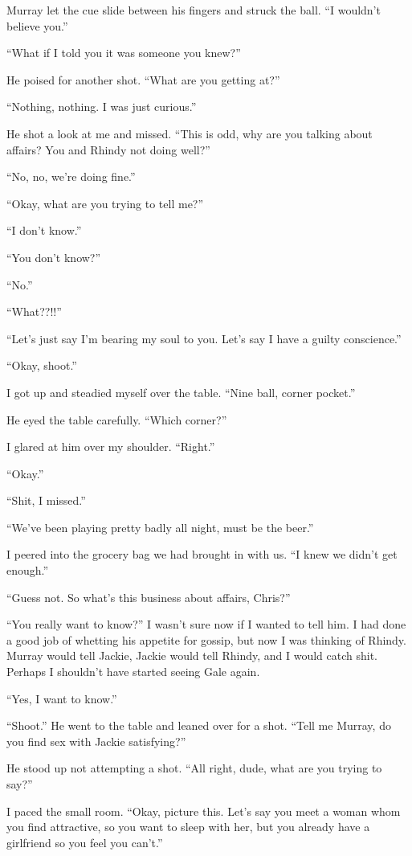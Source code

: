 Murray let the cue slide between his fingers and struck the ball. ``I
wouldn't believe you.''

``What if I told you it was someone you knew?''

He poised for another shot. ``What are you getting at?''

``Nothing, nothing. I was just curious.''

He shot a look at me and missed. ``This is odd, why are you talking
about affairs? You and Rhindy not doing well?''

``No, no, we're doing fine.''

``Okay, what are you trying to tell me?''

``I don't know.''

``You don't know?''

``No.''

``What??!!''

``Let's just say I'm bearing my soul to you. Let's say I have a guilty
conscience.''

``Okay, shoot.''

I got up and steadied myself over the table. ``Nine ball, corner
pocket.''

He eyed the table carefully. ``Which corner?''

I glared at him over my shoulder. ``Right.''

``Okay.''

``Shit, I missed.''

``We've been playing pretty badly all night, must be the beer.''

I peered into the grocery bag we had brought in with us. ``I knew we
didn't get enough.''

``Guess not. So what's this business about affairs, Chris?''

``You really want to know?'' I wasn't sure now if I wanted to tell him.
I had done a good job of whetting his appetite for gossip, but now I was
thinking of Rhindy. Murray would tell Jackie, Jackie would tell Rhindy,
and I would catch shit. Perhaps I shouldn't have started seeing Gale
again.

``Yes, I want to know.''

``Shoot.'' He went to the table and leaned over for a shot. ``Tell me
Murray, do you find sex with Jackie satisfying?''

He stood up not attempting a shot. ``All right, dude, what are you
trying to say?''

I paced the small room. ``Okay, picture this. Let's say you meet a woman
whom you find attractive, so you want to sleep with her, but you already
have a girlfriend so you feel you can't.''

